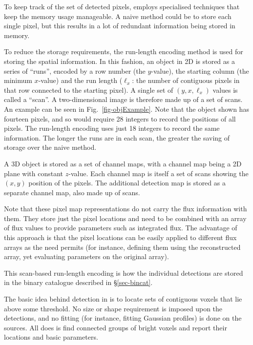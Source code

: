 To keep track of the set of detected pixels, \duchamp
employs specialised techniques that keep the memory usage
manageable. A naive method could be to store each single pixel, but
this results in a lot of redundant information being stored in memory.

To reduce the storage requirements, the run-length encoding method is
used for storing the spatial information. In this fashion, an object
in 2D is stored as a series of ``runs'', encoded by a row number (the
$y$-value), the starting column (the minimum $x$-value) and the run
length ($\ell_x$: the number of contiguous pixels in that row
connected to the starting pixel). A single set of $(y,x,\ell_x)$
values is called a ``scan''. A two-dimensional image is therefore made
up of a set of scans. An example can be seen in
Fig.~\ref{fig-objExample}. Note that the object shown has fourteen
pixels, and so would require 28 integers to record the positions of
all pixels. The run-length encoding uses just 18 integers to record
the same information. The longer the runs are in each scan, the
greater the saving of storage over the naive method.

A 3D object is stored as a set of channel maps, with a channel map
being a 2D plane with constant $z$-value. Each channel map is itself a
set of scans showing the $(x,y)$ position of the pixels. The
additional detection map is stored as a separate channel map, also
made up of scans.

Note that these pixel map representations do not carry the flux
information with them. They store just the pixel locations and need to
be combined with an array of flux values to provide parameters such as
integrated flux. The advantage of this approach is that the pixel
locations can be easily applied to different flux arrays as the need
permits (for instance, defining them using the reconstructed array,
yet evaluating parameters on the original array).

This scan-based run-length encoding is how the individual detections
are stored in the binary catalogue described in \S\ref{sec-bincat}.

\label{sec-searchTechnique}

The basic idea behind detection in \duchamp is to locate sets of
contiguous voxels that lie above some threshold. No size or shape
requirement is imposed upon the detections, and no fitting (for
instance, fitting Gaussian profiles) is done on the sources. All
\duchamp does is find connected groups of bright voxels and report
their locations and basic parameters.

